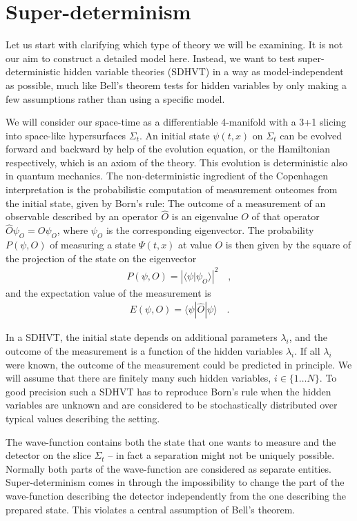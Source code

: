 \documentclass{svjour2}                    %
\newcommand{\beqn}{\begin{eqnarray}}
\newcommand{\eeqn}{\end{eqnarray}}
\begin{document}
\section{Super-determinism}

Let us start with clarifying which type of theory we will be examining. It is
not our aim to construct a detailed model here. Instead, we want to test 
super-deterministic hidden variable theories ({\sc SDHVT}) in a way as model-independent as possible, much like Bell's theorem
tests for hidden variables by only making a few assumptions rather than using
a specific model.

We will consider our space-time as a differentiable 4-manifold with a
3+1 slicing into space-like hypersurfaces $\Sigma_t$. An initial state
$\psi(t,x)$ on $\Sigma_t$ can be evolved forward and backward by help
of the evolution equation, or the Hamiltonian respectively, which is
an axiom of the theory. This evolution
is deterministic also in quantum mechanics. The non-deterministic ingredient of
the Copenhagen interpretation
is the probabilistic computation of measurement outcomes from the initial 
state, given by Born's rule: The outcome of a measurement of an
observable described by an operator $\hat O$ is an eigenvalue $O$ of that
operator $\hat O \psi_O = O \psi_O$, where $\psi_O$ is the corresponding
eigenvector. The probability $P(\psi, O)$ of measuring a 
state $\Psi(t,x)$ at value $O$ is then given by the square of the projection of the
state on the eigenvector
\beqn
P(\psi, O) = \left| \langle \psi | \psi_O \rangle \right|^2 \quad,
\eeqn
and the expectation value of the measurement is
\beqn
E(\psi, O) = \langle \psi \left| \hat O \right| \psi \rangle \quad.
\eeqn

In a {\sc SDHVT}, the initial state depends 
on additional parameters $\lambda_i$, and the outcome of the measurement is a function of the
hidden variables $\lambda_i$. If all $\lambda_i$ were known, the outcome
of the measurement could be predicted in principle. We will assume that there are finitely
many such hidden variables, $i \in \{1\dots N\}$. To good precision such a {\sc SDHVT} has to
reproduce Born's rule when the hidden variables are unknown and are
considered to be stochastically distributed over typical values describing the setting. 

The wave-function contains both the state that one wants
to measure and the detector on the slice $\Sigma_t$ -- in fact a separation
might not be uniquely possible. Normally both parts of the wave-function
are considered as separate entities. Super-determinism comes
in through the impossibility to change the part of the wave-function 
describing the detector independently from the one describing the prepared
state. This violates a central assumption of Bell's theorem. 
\end{document}
